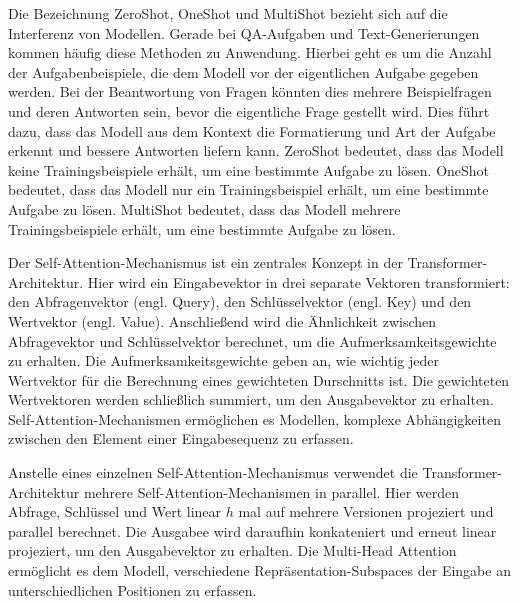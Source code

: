 \begin{definition}\label{def:zeroshot-oneshot-multishot}
    Die Bezeichnung ZeroShot, OneShot und MultiShot bezieht sich auf die Interferenz von Modellen.
    Gerade bei \ac{QA}-Aufgaben und Text-Generierungen kommen häufig diese Methoden zu Anwendung.
    Hierbei geht es um die Anzahl der Aufgabenbeispiele, die dem Modell vor der eigentlichen Aufgabe gegeben werden.
    Bei der Beantwortung von Fragen könnten dies mehrere Beispielfragen und deren Antworten sein, bevor die eigentliche Frage gestellt wird.
    Dies führt dazu, dass das Modell aus dem Kontext die Formatierung und Art der Aufgabe erkennt und bessere Antworten liefern kann.
    ZeroShot bedeutet, dass das Modell keine Trainingsbeispiele erhält, um eine bestimmte Aufgabe zu lösen.
    OneShot bedeutet, dass das Modell nur ein Trainingsbeispiel erhält, um eine bestimmte Aufgabe zu lösen.
    MultiShot bedeutet, dass das Modell mehrere Trainingsbeispiele erhält, um eine bestimmte Aufgabe zu lösen.
\end{definition}

\begin{definition}\label{def:self-attention-mechanismus}
    Der Self-Attention-Mechanismus ist ein zentrales Konzept in der Transformer-Architektur.
    Hier wird ein Eingabevektor in drei separate Vektoren transformiert:
    den Abfragenvektor (engl. Query), den Schlüsselvektor (engl. Key) und den Wertvektor (engl. Value).
    Anschließend wird die Ähnlichkeit zwischen Abfragevektor und Schlüsselvektor berechnet,
    um die Aufmerksamkeitsgewichte zu erhalten.
    Die Aufmerksamkeitsgewichte geben an, wie wichtig jeder Wertvektor für die Berechnung eines gewichteten
    Durschnitts ist. Die gewichteten Wertvektoren werden schließlich summiert, um den Ausgabevektor zu erhalten.
    Self-Attention-Mechanismen ermöglichen es Modellen, komplexe Abhängigkeiten zwischen den Element einer
    Eingabesequenz zu erfassen.
\end{definition}

\begin{definition}\label{def:multi-head-attention}
    Anstelle eines einzelnen Self-Attention-Mechanismus verwendet die Transformer-Architektur mehrere Self-Attention-Mechanismen in parallel. Hier werden Abfrage, Schlüssel und Wert linear $h$ mal auf mehrere Versionen projeziert und parallel berechnet. Die Ausgabee wird daraufhin konkateniert und erneut linear projeziert, um den Ausgabevektor zu erhalten. Die Multi-Head Attention ermöglicht es dem Modell, verschiedene Repräsentation-Subspaces der Eingabe an unterschiedlichen Positionen zu erfassen.
\end{definition}

